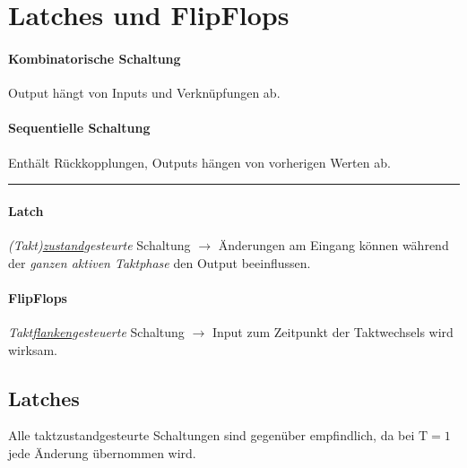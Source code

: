 \section{Latches und FlipFlops}
\begin{center}
    \begin{minipage}[t]{0.45\linewidth}
        \paragraph{Kombinatorische Schaltung}
        Output hängt von Inputs und Verknüpfungen ab.
    \end{minipage}
    \hfill
    \begin{minipage}[t]{0.45\linewidth}
        \paragraph{Sequentielle Schaltung}
        Enthält Rückkopplungen, Outputs hängen von vorherigen Werten ab.
    \end{minipage}
\end{center}
\hrule
\begin{center}
    \begin{minipage}[t]{0.45\linewidth}
        \paragraph{Latch}
        \emph{(Takt)\underline{zustand}gesteurte} Schaltung $\rightarrow$ Änderungen am Eingang können während der \emph{ganzen aktiven Taktphase} den Output beeinflussen.
    \end{minipage}
    \hfill
    \begin{minipage}[t]{0.45\linewidth}
        \paragraph{FlipFlops}
        \emph{Takt\underline{flanken}gesteuerte} Schaltung $\rightarrow$ Input zum Zeitpunkt der Taktwechsels wird wirksam.
    \end{minipage}
\end{center}
\subsection{Latches}
Alle taktzustandgesteurte Schaltungen sind gegenüber  empfindlich, da bei $\text{T}=1$ jede Änderung übernommen wird.
